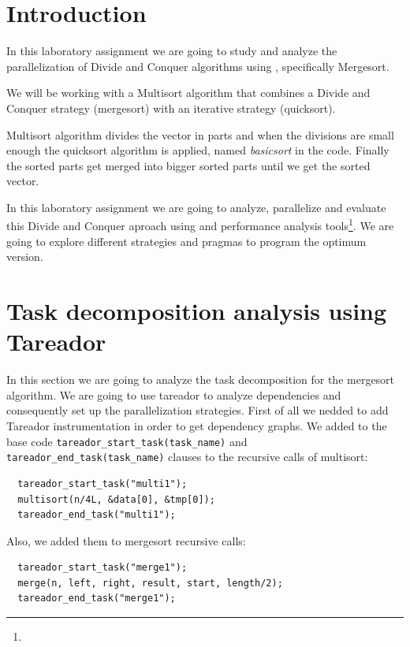\documentclass{article}
\begin{document}

\clearpage
\tableofcontents
\clearpage 


\section{Introduction}
\justify
In this laboratory assignment we are going to study and analyze 
the parallelization of Divide and Conquer algorithms using \textit{\omp},
specifically Mergesort.

\justify
We will be working with a  Multisort algorithm that combines a 
Divide and Conquer strategy (mergesort) with an iterative strategy (quicksort).

\justify
Multisort algorithm divides the vector in parts and when the divisions 
are small enough the quicksort algorithm is applied, named \textit{basicsort} in the code. 
Finally the sorted parts get merged into bigger sorted parts until we get the sorted vector.

\justify
In this laboratory assignment we are going to analyze, parallelize and evaluate this Divide and Conquer aproach using \textit{\omp} and \bsc performance analysis tools\footnote{\tools}. We are going to explore different strategies and pragmas to program the optimum version.
\clearpage

\section{Task decomposition analysis using Tareador} \label{tasktareador}
\justify
In this section we are going to analyze the task decomposition for the
mergesort algorithm. We are going to use tareador to analyze dependencies
and consequently set up the parallelization strategies.
\justify
First of all we nedded to add Tareador instrumentation in order 
to get dependency graphs.
We added to the base code \texttt{tareador\_start\_task(task\_name)} and 
\texttt{tareador\_end\_task(task\_name)} clauses to the recursive calls
of
multisort:
\begin{lstlisting}
  tareador_start_task("multi1");
  multisort(n/4L, &data[0], &tmp[0]);
  tareador_end_task("multi1");
\end{lstlisting}
Also, we added them to mergesort recursive calls: 
\begin{lstlisting}
  tareador_start_task("merge1");
  merge(n, left, right, result, start, length/2);
  tareador_end_task("merge1");
\end{lstlisting}
\end{document}
